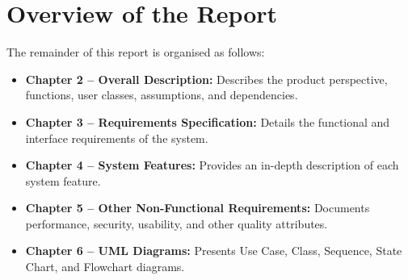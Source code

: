 \section{Overview of the Report}
The remainder of this report is organised as follows:
\begin{itemize}[leftmargin=*]
    \item \textbf{Chapter 2 -- Overall Description:} Describes the product perspective, functions, user classes, assumptions, and dependencies.
    \item \textbf{Chapter 3 -- Requirements Specification:} Details the functional and interface requirements of the system.
    \item \textbf{Chapter 4 -- System Features:} Provides an in-depth description of each system feature.
    \item \textbf{Chapter 5 -- Other Non-Functional Requirements:} Documents performance, security, usability, and other quality attributes.
    \item \textbf{Chapter 6 -- UML Diagrams:} Presents Use Case, Class, Sequence, State Chart, and Flowchart diagrams.
\end{itemize}
